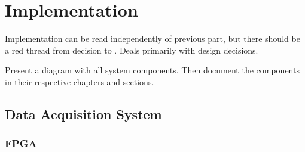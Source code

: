 \documentclass[a4paper,oneside]{alpenthesis/alpenthesis}
\begin{document}
%
%
%

\part{Implementation} %
\label{part:Implementation}
Implementation can be read independently of previous part, but there should be
a  red thread  from decision  to . Deals  primarily with
design decisions.

Present a diagram with all  system components. Then document the components in
their respective chapters and sections.

\chapter{Data Acquisition System}
\label{ch:data_acquisition_system}
\section{FPGA}
\end{document}

